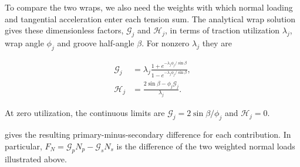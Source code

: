 \documentclass[11pt]{report}
\numberwithin{equation}{section}
\begin{document}
To compare the two wraps, we also need the weights with which normal
loading and tangential acceleration enter each tension sum. The analytical
wrap solution gives these dimensionless factors, \(\mathcal G_j\) and
\(\mathcal H_j\), in terms of traction utilization \(\lambda_j\), wrap
angle \(\phi_j\) and groove half-angle \(\beta\). For nonzero
\(\lambda_j\) they are

\begin{equation}
\begin{aligned}
 \mathcal G_j
 &=\lambda_j
   \frac{1+e^{-\lambda_j\phi_j/\sin\beta}}
        {1-e^{-\lambda_j\phi_j/\sin\beta}},\\[4pt]
 \mathcal H_j
 &=\frac{2\sin\beta-\phi_j\mathcal G_j}{\lambda_j}.
\end{aligned}
\label{eq:results_belt_contact_factors}
\end{equation}

At zero utilization, the continuous limits are
\(\mathcal G_j=2\sin\beta/\phi_j\) and \(\mathcal H_j=0\).

 gives the resulting primary-minus-secondary
difference for each contribution. In particular,
\(F_N=\mathcal G_pN_p-\mathcal G_sN_s\) is the difference of the two
weighted normal loads illustrated above.
\end{document}
